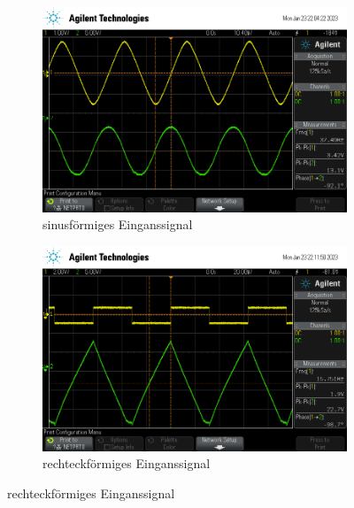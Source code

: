 \begin{figure}
    \centering
    \begin{subfigure}[b]{0.5\textwidth}
        \centering
        \includegraphics[width=\textwidth]{usb/Int_Sin.png}
        \caption{sinusförmiges Einganssignal}
    \end{subfigure}
    \begin{subfigure}[b]{0.5\textwidth}
        \centering
        \includegraphics[width=\textwidth]{usb/Int_Recht.png}
        \caption{rechteckförmiges Einganssignal}
    \end{subfigure}


\end{figure}

